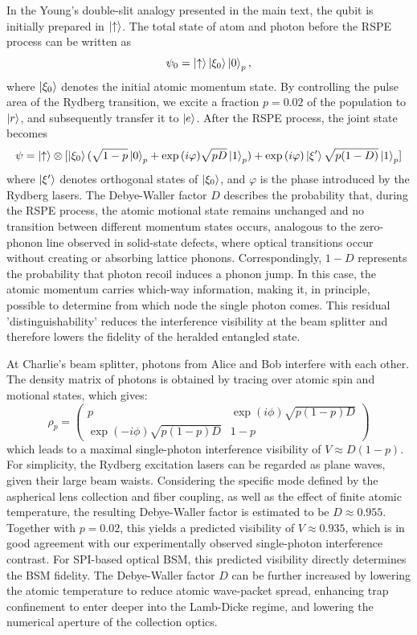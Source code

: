 \documentclass[aps,reprint,showpacs,superscriptaddress]{revtex4-2}
\begin{document}
In the Young's double-slit analogy presented in the main text, the qubit is initially prepared in $\ket{\uparrow}$. The total state of atom and photon before the RSPE process can be written as
\begin{equation}
	\psi_0 = \ket{\uparrow}\ket{\xi_0}\ket{0}_{p},
\end{equation}
where $\ket{\xi_0}$ denotes the initial atomic momentum state. By controlling the pulse area of the Rydberg transition, we excite a fraction $p = 0.02$ of the population to $\ket{r}$, and subsequently transfer it to $\ket{e}$. After the RSPE process, the joint state becomes
\begin{equation}
	\psi =\ket{\uparrow}\otimes[\ket{\xi_0}(\sqrt{1-p}\ket{0}_{p}+\exp{(i\varphi)}\sqrt{pD}\ket{1}_{p})+\exp{(i\varphi)}\ket{\xi'}\sqrt{p(1-D)}\ket{1}_{p}]
\end{equation}
where $\ket{\xi'}$ denotes orthogonal states of $\ket{\xi_0}$, and $\varphi$ is the phase introduced by the Rydberg lasers. The Debye-Waller factor $D$ describes the probability that, during the RSPE process, the atomic motional state remains unchanged and no transition between different momentum states occurs, analogous to the zero-phonon line observed in solid-state defects, where optical transitions occur without creating or absorbing lattice phonons. Correspondingly, $1-D$ represents the probability that photon recoil induces a phonon jump. In this case, the atomic momentum carries which-way information, making it, in principle, possible to determine from which node the single photon comes. This residual 'distinguishability' reduces the interference visibility at the beam splitter and therefore lowers the fidelity of the heralded entangled state.

At Charlie's beam splitter, photons from Alice and Bob interfere with each other. The density matrix of photons is obtained by tracing over atomic spin and motional states, which gives:
\begin{equation}
	\rho_p =
	\begin{pmatrix}
		p & \exp{(i\phi)}\sqrt{p(1-p)D} \\
		\exp{(-i\phi)}\sqrt{p(1-p)D} & 1-p
	\end{pmatrix}
\end{equation}
which leads to a maximal single-photon interference visibility of $V \approx D(1-p)$. For simplicity, the Rydberg excitation lasers can be regarded as plane waves, given their large beam waists. Considering the specific mode defined by the aspherical lens collection and fiber coupling, as well as the effect of finite atomic temperature, the resulting Debye-Waller factor is estimated to be $D \approx 0.955$. Together with $p = 0.02$, this yields a predicted visibility of $V \approx 0.935$, which is in good agreement with our experimentally observed single-photon interference contrast. For SPI-based optical BSM, this predicted visibility directly determines the BSM fidelity. The Debye-Waller factor $D$ can be further increased by lowering the atomic temperature to reduce atomic wave-packet spread, enhancing trap confinement to enter deeper into the Lamb-Dicke regime, and lowering the numerical aperture of the collection optics.
\end{document}

